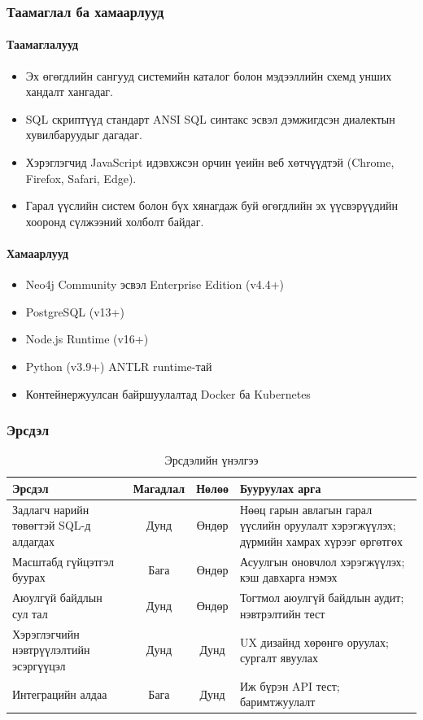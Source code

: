 \subsubsection{Таамаглал ба хамаарлууд}

\paragraph{Таамаглалууд}
\begin{itemize}
    \item Эх өгөгдлийн сангууд системийн каталог болон мэдээллийн схемд унших хандалт хангадаг.
    \item SQL скриптүүд стандарт ANSI SQL синтакс эсвэл дэмжигдсэн диалектын хувилбаруудыг дагадаг.
    \item Хэрэглэгчид JavaScript идэвхжсэн орчин үеийн веб хөтчүүдтэй (Chrome, Firefox, Safari, Edge).
    \item Гарал үүслийн систем болон бүх хянагдаж буй өгөгдлийн эх үүсвэрүүдийн хооронд сүлжээний холболт байдаг.
\end{itemize}

\paragraph{Хамаарлууд}
\begin{itemize}
    \item Neo4j Community эсвэл Enterprise Edition (v4.4+)
    \item PostgreSQL (v13+)
    \item Node.js Runtime (v16+)
    \item Python (v3.9+) ANTLR runtime-тай
    \item Контейнержуулсан байршуулалтад Docker ба Kubernetes
\end{itemize}

\subsubsection{Эрсдэл}

\begin{table}[htbp]
\centering
\caption{Эрсдэлийн үнэлгээ}
\label{tab:risks}
\begin{tabular}{|p{4cm}|c|c|p{5cm}|}
\hline
\textbf{Эрсдэл} & \textbf{Магадлал} & \textbf{Нөлөө} & \textbf{Бууруулах арга} \\
\hline
Задлагч нарийн төвөгтэй SQL-д алдагдах & Дунд & Өндөр & Нөөц гарын авлагын гарал үүслийн оруулалт хэрэгжүүлэх; дүрмийн хамрах хүрээг өргөтгөх \\
\hline
Масштабд гүйцэтгэл буурах & Бага & Өндөр & Асуулгын оновчлол хэрэгжүүлэх; кэш давхарга нэмэх \\
\hline
Аюулгүй байдлын сул тал & Дунд & Өндөр & Тогтмол аюулгүй байдлын аудит; нэвтрэлтийн тест \\
\hline
Хэрэглэгчийн нэвтрүүлэлтийн эсэргүүцэл & Дунд & Дунд & UX дизайнд хөрөнгө оруулах; сургалт явуулах \\
\hline
Интеграцийн алдаа & Бага & Дунд & Иж бүрэн API тест; баримтжуулалт \\
\hline
\end{tabular}
\end{table}

